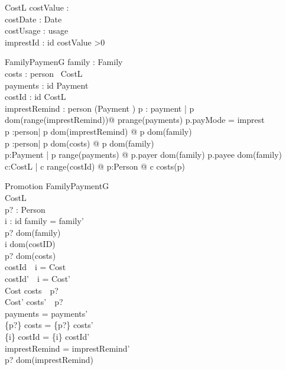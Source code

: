 \documentclass{article}
\begin{document}
\begin{schema}{CostL}
costValue : \nat\\
costDate : Date\\
costUsage : usage\\
imprestId : id
\where
costValue >0
\end{schema}


\begin{schema}{FamilyPaymenG}
family : Family\\
costs : person \fun \power~CostL\\
payments : id \bij Payment\\
costId : id \bij CostL\\ 
imprestRemind : person \fun (Payment \rel \nat)
\where
\forall p : payment | p \in dom(range(imprestRemind))@ p\in range(payments) \land p.payMode = imprest\\
\forall p :person| p \in dom(imprestRemind) @ p \in dom(family)\\
\forall p :person| p \in dom(costs) @ p \in dom(family)\\
\forall p:Payment | p \in range(payments) @ p.payer \in dom(family) \land p.payee \in dom(family)\\
\forall c:CostL | c \in range(costId) @ \exists p:Person @ c \in costs(p)
\end{schema}

\begin{schema}{Promotion}
\Delta FamilyPaymentG\\
\Delta CostL\\
p? : Person\\
i : id
\where
family = family'\\
p? \in dom(family)\\
i \in dom(costID)\\
p? \in dom(costs)\\
costId~~i = \Theta Cost\\
costId'~~i = \Theta Cost'\\
\Theta Cost \in costs~~p?\\
\Theta Cost' \in costs'~~p?\\
payments = payments'\\
\{p?\} \ndres costs = \{p?\} \ndres costs'\\
\{i\} \ndres costId = \{i\} \ndres costId'\\
imprestRemind = imprestRemind'\\
p? \in dom(imprestRemind)
\end{schema}
\end{document}
